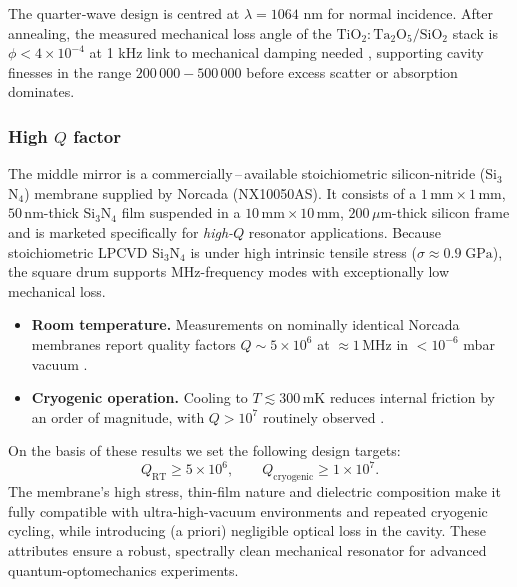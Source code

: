 The quarter‐wave design is centred at $\lambda = 1064$ nm for normal incidence.  After annealing, the measured mechanical loss angle of the $\mathrm{TiO_2\!:\!Ta_2O_5}/\mathrm{SiO_2}$ stack is $\phi < 4\times10^{-4}$ at 1 kHz  \color{red} link to mechanical damping needed \color{black}, supporting cavity finesses in the range $200\,000-500\,000$ before excess scatter or absorption dominates\cite{AmatoPhD}.

\subsubsection{High $Q$ factor}

The middle mirror is a commercially\,–\,available stoichiometric silicon-nitride
(Si$_3$N$_4$) membrane supplied by Norcada (NX10050AS)\cite{SiN_review,Norcada_datasheet}.
It consists of a $1\,\mathrm{mm}\times1\,\mathrm{mm}$, $50\,\mathrm{nm}$-thick
Si$_3$N$_4$ film suspended in a $10\,\mathrm{mm}\times10\,\mathrm{mm}$,
$200\,\mu\mathrm{m}$-thick silicon frame and is marketed specifically for
\emph{high-$Q$} resonator applications. Because stoichiometric LPCVD Si$_3$N$_4$ is under high intrinsic tensile
stress ($\sigma\!\approx\!0.9\;\mathrm{GPa}$), the square drum supports
MHz-frequency modes with exceptionally low mechanical loss\cite{SiN_review}.

\begin{itemize}
  \item \textbf{Room temperature.}  Measurements on nominally identical
        Norcada membranes report quality factors
        $Q \sim 5\times10^{6}$ at $\approx1\,\mathrm{MHz}$ in
        $<10^{-6}$ mbar vacuum \cite{SiN_review,Norcada_datasheet}.
  \item \textbf{Cryogenic operation.}  Cooling to $T \lesssim 300\,\mathrm{mK}$
        reduces internal friction by an order of magnitude, with
        $Q>10^{7}$ routinely observed \cite{SiN_cryogenic}.
\end{itemize}

On the basis of these results we set the following design targets:
\[
  Q_{\mathrm{RT}} \ge 5\times10^{6}, \qquad
  Q_{\mathrm{cryogenic}} \ge 1\times10^{7}.
\]
The membrane’s high stress, thin-film nature and dielectric composition make
it fully compatible with ultra-high-vacuum environments and repeated
cryogenic cycling, while introducing (a priori) negligible optical loss in the cavity.
These attributes ensure a robust, spectrally clean mechanical resonator for
advanced quantum-optomechanics experiments.

